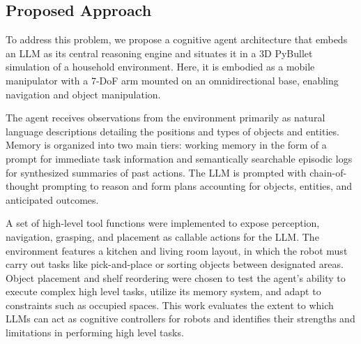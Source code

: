 \documentclass[../report.tex]{subfiles}
\begin{document}
\subsection{Proposed Approach}
\label{sec:introduction:proposed_approach}

To address this problem, we propose a cognitive agent architecture that embeds an LLM as its central reasoning engine and situates it in a 3D PyBullet simulation of a household environment. Here, it is embodied as a mobile manipulator with a 7-DoF arm mounted on an omnidirectional base, enabling navigation and object manipulation.

The agent receives observations from the environment primarily as natural language descriptions detailing the positions and types of objects and entities. Memory is organized into two main tiers: working memory in the form of a prompt for immediate task information and semantically searchable episodic logs for synthesized summaries of past actions. The LLM is prompted with chain-of-thought prompting to reason and form plans accounting for objects, entities, and anticipated outcomes.

A set of high-level tool functions were implemented to expose perception, navigation, grasping, and placement as callable actions for the LLM. The environment features a kitchen and living room layout, in which the robot must carry out tasks like pick-and-place or sorting objects between designated areas. Object placement and shelf reordering were chosen to test the agent's ability to execute complex high level tasks, utilize its memory system, and adapt to constraints such as occupied spaces. This work evaluates the extent to which LLMs can act as cognitive controllers for robots and identifies their strengths and limitations in performing high level tasks.
\end{document}
